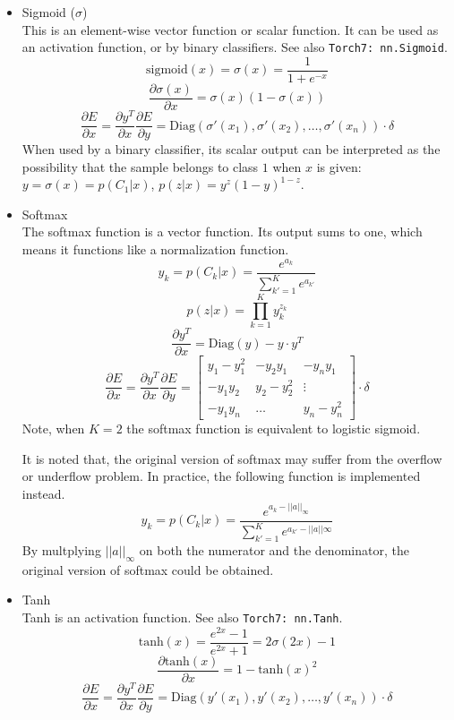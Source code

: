 \begin{itemize}
 \item Sigmoid ($\sigma$)\\
	 This is an element-wise vector function or scalar function.
	 It can be used as an activation function, or by binary classifiers.
	 See also \verb|Torch7: nn.Sigmoid|.
	$$\text{sigmoid}(x) = \sigma(x) = \frac{1}{1+e^{-x}}$$
	$$\frac{\partial \sigma(x)}{\partial x} =
		 \sigma(x) (1-\sigma(x)) $$
	$$\frac{\partial E}{\partial x} =
		 \frac{\partial y^T}{\partial x}
		 \frac{\partial E}{\partial y} =
		 \text{Diag}(\sigma'(x_1), \sigma'(x_2), \ldots,
		 \sigma'(x_n)) \cdot \delta $$
	When used by a binary classifier, its scalar output can be
	 interpreted as the possibility that the sample belongs to
		 class $1$ when $x$ is given:
	$y=\sigma(x)=p(C_1|x)$, $p(z|x) = y^z (1-y)^{1-z}$.
	
 \item Softmax\\
	  The softmax function is a vector function. Its output sums to one,
	  which means it functions like a normalization function.
   $$y_k = p(C_k|x) = \frac{e^{a_k}}{\sum_{k'=1}^K e^{a_{k'}}}$$
   $$p(z|x) = \prod_{k=1}^K y_k^{z_k}$$
	 $$ \frac{\partial y^T}{\partial x} = \text{Diag}(y) - y\cdot y^T$$
		 $$\frac{\partial E}{\partial x} = \frac{\partial y^T}{\partial x}
		 \frac{\partial E}{\partial y} = \begin{bmatrix}
			 y_1 - y_1^2 & -y_2y_1 & -y_ny_1\\
			 -y_1y_2 & y_2 - y_2^2 & \vdots \\
		 -y_1y_n & \ldots & y_n-y_n^2 \end{bmatrix} \cdot \delta$$
   Note, when $K=2$ the softmax function is equivalent to logistic sigmoid.

   It is noted that, the original version of softmax may suffer from the
   overflow or underflow problem. In practice, the following function is
   implemented instead.
   $$y_k = p(C_k|x) = \frac{e^{a_k - ||a||_\infty}}
           {\sum_{k'=1}^K e^{a_{k'} - ||a||\infty}}$$
   By multplying $||a||_\infty$ on both the numerator and the denominator,
   the original version of softmax could be obtained.

 \item Tanh\\
	Tanh is an activation function. See also \verb|Torch7: nn.Tanh|.
	$$\text{tanh}(x) = \frac{e^{2x} - 1}{e^{2x} + 1} = 2\sigma(2x) - 1$$
	$$\frac{\partial \text{tanh}(x)}{\partial x} =
	 1 - \text{tanh}(x)^2$$
  $$\frac{\partial E}{\partial x} = \frac{\partial y^T}{\partial x}
	 \frac{\partial E}{\partial y} = \text{Diag}(y'(x_1),
	 y'(x_2),\ldots,y'(x_n)) \cdot \delta$$

 \end{itemize}

